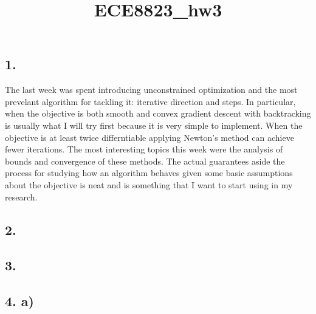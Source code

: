 \documentclass[11pt]{article}
\title{ECE8823\_hw3}
\begin{document}
    
    
    \maketitle
    
    

    
    

    \hypertarget{section}{%
\subsection{1.}\label{section}}

The last week was spent introducing unconstrained optimization and the
most prevelant algorithm for tackling it: iterative direction and steps.
In particular, when the objective is both smooth and convex gradient
descent with backtracking is usually what I will try first because it is
very simple to implement. When the objective is at least twice
differntiable applying Newton's method can achieve fewer iterations. The
most interesting topics this week were the analysis of bounds and
convergence of these methods. The actual guarantees aside the process
for studying how an algorithm behaves given some basic assumptions about
the objective is neat and is something that I want to start using in my
research.

    \hypertarget{section}{%
\subsection{2.}\label{section}}

    \hypertarget{section}{%
\subsection{3.}\label{section}}

    \hypertarget{a}{%
\subsection{4. a)}\label{a}}
\end{document}
